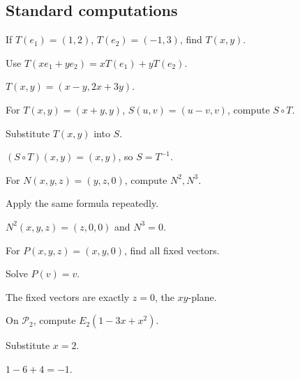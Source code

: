 \subsection*{Standard computations}

\begin{exercise}\label{exr:i05-expand-01}
If \(T(e_1)=(1,2)\), \(T(e_2)=(-1,3)\), find \(T(x,y)\).
\end{exercise}
\begin{hint}
Use \(T(xe_1+ye_2)=xT(e_1)+yT(e_2)\).
\end{hint}
\begin{solution}
\(T(x,y)=(x-y,2x+3y)\).
\end{solution}

\begin{exercise}[Composition]\label{exr:i05-expand-02}
For \(T(x,y)=(x+y,y)\), \(S(u,v)=(u-v,v)\), compute \(S\circ T\).
\end{exercise}
\begin{hint}
Substitute \(T(x,y)\) into \(S\).
\end{hint}
\begin{solution}
\((S\circ T)(x,y)=(x,y)\), so \(S=T^{-1}\).
\end{solution}

\begin{exercise}\label{exr:i05-expand-03}
For \(N(x,y,z)=(y,z,0)\), compute \(N^2,N^3\).
\end{exercise}
\begin{hint}
Apply the same formula repeatedly.
\end{hint}
\begin{solution}
\(N^2(x,y,z)=(z,0,0)\) and \(N^3=0\).
\end{solution}

\begin{exercise}[Projection]\label{exr:i05-expand-04}
For \(P(x,y,z)=(x,y,0)\), find all fixed vectors.
\end{exercise}
\begin{hint}
Solve \(P(v)=v\).
\end{hint}
\begin{solution}
The fixed vectors are exactly \(z=0\), the \(xy\)-plane.
\end{solution}

\begin{exercise}[Evaluation]\label{exr:i05-expand-05}
On \(\mathcal P_2\), compute \(E_2(1-3x+x^2)\).
\end{exercise}
\begin{hint}
Substitute \(x=2\).
\end{hint}
\begin{solution}
\(1-6+4=-1\).
\end{solution}

